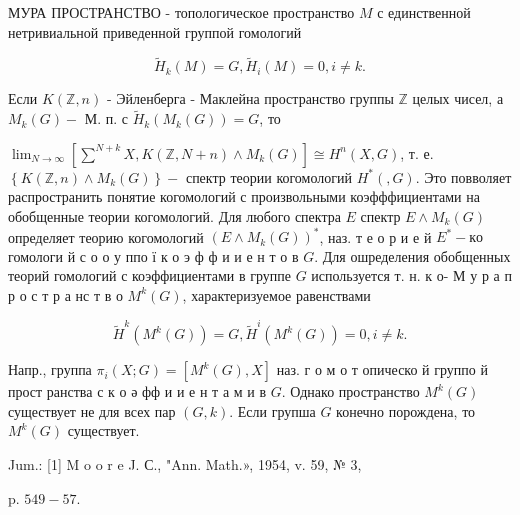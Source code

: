 \documentclass[10pt]{article}
\begin{document}
МУРА ПРОСТРАНСТВО - топологическое пространство $M$ с единственной нетривиальной приведенной группой гомологий



\[

\tilde{H}_{k}(M)=G, \tilde{H}_{i}(M)=0, i \neq k .

\]



Если $K(\mathbb{Z}, n)$ - Эйленберга - Маклейна пространство группы $\mathbb{Z}$ целых чисел, а $M_{k}(G)-$ М. п. с $\tilde{H}_{k}\left(M_{k}(G)\right)=G$, то



$\lim _{N \rightarrow \infty}\left[\sum^{N+k} X, K(\mathbb{Z}, N+n) \wedge M_{k}(G)\right] \cong H^{n}(X, G)$, т. е. $\left\{K(\mathbb{Z}, n) \wedge M_{k}(G)\right\}-$ спектр теории когомологий $H^{*}(, G)$. Это повволяет распространить понятие когомологий с произвольными коэфффициентами на обобщенные теории когомологий. Для любого спектра $E$ спектр $E \wedge M_{k}(G)$ определяет теорию когомологий $\left(E \wedge M_{k}(G)\right)^{*}$, наз. т е о р и е й $E^{*}-к о$ гомологи й с $о$ о у ппо ї к о э ф ф и и е н т о в $G$. Для ошределения обобщенных теорий гомологий с коэффициентами в группе $G$ используется т. н. к о- М у р а п р о с т р а нс т в о $M^{k}(G)$, характеризуемое равенствами



\[

\tilde{H}^{k}\left(M^{k}(G)\right)=G, \tilde{H}^{i}\left(M^{k}(G)\right)=0, i \neq k .

\]



Напр., группа $\pi_{i}(X ; G)=\left[M^{k}(G), X\right]$ наз. $г$ о м о т опическо й группо й прост ранства с к о ә фф и и е н т а м и в $G$. Однако пространство $M^{k}(G)$ существует не для всех пар $(G, k)$. Если групша $G$ конечно порождена, то $M^{k}(G)$ существует.



Jum.: [1] M o o r e J. С., "Ann. Math.», 1954, v. 59, № 3,

p. $549-57$.
\end{document}

